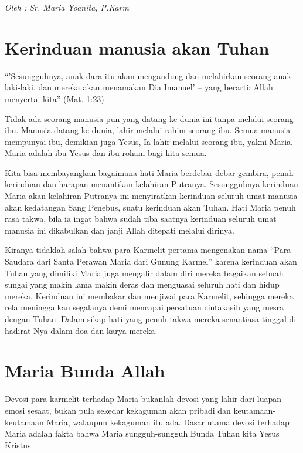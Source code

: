 
\begin{center}\emph{Oleh : Sr. Maria Yoanita, P.Karm}\end{center}

\section*{Kerinduan manusia akan Tuhan}

``'Sesungguhnya, anak dara itu akan mengandung dan melahirkan seorang anak laki-laki, dan mereka akan menamakan Dia Imanuel' -- yang berarti: Allah menyertai kita'' (Mat. 1:23)

Tidak ada seorang manusia pun yang datang ke dunia ini tanpa melalui seorang ibu. Manusia datang ke dunia, lahir melalui rahim seorang ibu. Semua manusia mempunyai ibu, demikian juga Yesus, Ia lahir melalui seorang ibu, yakni Maria. Maria adalah ibu Yesus dan ibu rohani bagi kita semua. 

Kita bisa membayangkan bagaimana hati Maria berdebar-debar gembira, penuh kerinduan dan harapan menantikan kelahiran Putranya. Sesungguhnya kerinduan Maria akan kelahiran Putranya ini menyiratkan kerinduan seluruh umat manusia akan kedatangan Sang Penebus, suatu kerinduan akan Tuhan. Hati Maria penuh rasa takwa, bila ia ingat bahwa sudah tiba saatnya kerinduan seluruh umat manusia ini dikabulkan dan janji Allah ditepati melalui dirinya.

Kiranya tidaklah salah bahwa para Karmelit pertama mengenakan nama ``Para Saudara dari Santa Perawan Maria dari Gunung Karmel'' karena kerinduan akan Tuhan yang dimiliki Maria juga mengalir dalam diri mereka bagaikan sebuah sungai yang makin lama makin deras dan menguasai seluruh hati dan hidup mereka. Kerinduan ini membakar dan menjiwai para Karmelit, sehingga mereka rela meninggalkan segalanya demi mencapai persatuan cintakasih yang mesra dengan Tuhan. Dalam sikap hati yang penuh takwa mereka senantiasa tinggal di hadirat-Nya dalam doa dan karya mereka.

\section*{Maria Bunda Allah}

Devosi para karmelit terhadap Maria bukanlah devosi yang lahir dari luapan emosi sesaat, bukan pula sekedar kekaguman akan pribadi dan keutamaan-keutamaan Maria, walaupun kekaguman itu ada. Dasar utama devosi terhadap Maria adalah fakta bahwa Maria sungguh-sungguh Bunda Tuhan kita Yesus Kristus.

